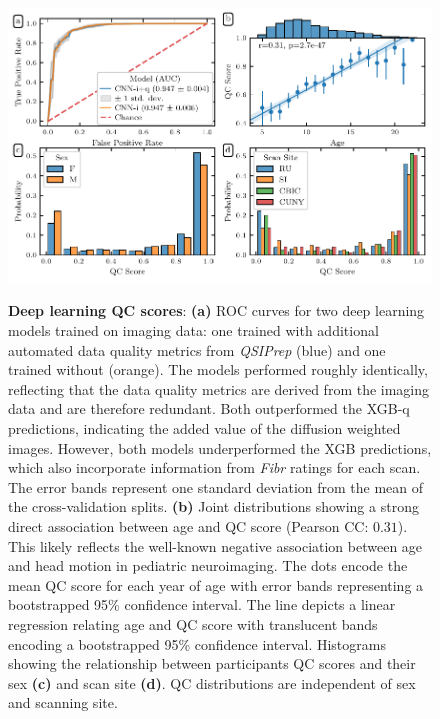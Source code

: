 \documentclass[fleqn,10pt,inline]{wlscirep}
\begin{document}
\begin{figure}[!t]
    {\label{fig:dl-qc:roc}}
    {\label{fig:dl-qc:joint}}
    {\label{fig:dl-qc:hist:sex}}
    {\label{fig:dl-qc:hist:site}}
    \centering
    \includegraphics[width=\linewidth]{deep_learning_qc.pdf}
    \caption{%
        {\bf Deep learning QC scores}:
        \textbf{(a)} ROC curves for two deep learning models trained on imaging data: one trained with
        additional automated data quality metrics from \emph{QSIPrep} (blue) and one
        trained without (orange). The models performed roughly identically,
        reflecting that the data quality metrics are derived from the imaging data and are therefore redundant. Both outperformed the XGB-q predictions, indicating the
        added value of the diffusion weighted images. However, both models
        underperformed the XGB predictions, which also incorporate
        information from \emph{Fibr} ratings for each scan. The error bands
        represent one standard deviation from the mean of the cross-validation
        splits.
        \textbf{(b)} Joint distributions showing a strong direct association
        between age and QC score (Pearson CC: $0.31$). This likely reflects the well-known negative
        association between age and head motion in pediatric neuroimaging.
        The dots encode the mean QC score for each year of age with error bands
        representing a bootstrapped 95\% confidence interval. The line depicts
        a linear regression relating age and QC score with translucent bands
        encoding a bootstrapped 95\% confidence interval.
        Histograms showing the relationship between participants QC scores and
        their sex \textbf{(c)} and scan site \textbf{(d)}. QC distributions are independent
        of sex and scanning site.
    }
    \label{fig:dl-qc}
\end{figure}
\end{document}
